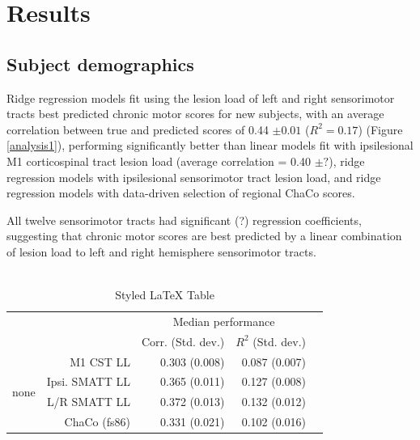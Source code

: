 \documentclass[10pt]{article}
\begin{document}
\section{Results}
\subsection*{Subject demographics}



Ridge regression models fit using the lesion load of left and right sensorimotor tracts best predicted chronic motor scores for new subjects, with an average correlation between true and predicted scores of 0.44 $\pm 0.01$ ($R^2 = 0.17$) (Figure \ref{analysis1}), performing significantly better than linear models fit with ipsilesional M1 corticospinal tract lesion load (average correlation = 0.40 $\pm ?$), ridge regression models with ipsilesional sensorimotor tract lesion load, and ridge regression models with data-driven selection of regional ChaCo scores.

All twelve sensorimotor tracts had significant (?) regression coefficients, suggesting that chronic motor scores are best predicted by a linear combination of lesion load to left and right hemisphere sensorimotor tracts. 
\\
\\
\begin{table}[h]
\centering
\caption{Styled LaTeX Table}
\label{table:5}
\begin{tabular}{rrrrr}
\toprule
 &  & \multicolumn{2}{c}{Median performance} \\
 &  & Corr. (Std. dev.) & $R^2$ (Std. dev.) \\
\midrule
\multirow[t]{4}{*}{none} & M1 CST LL & 0.303 (0.008) & 0.087 (0.007) \\
 & Ipsi. SMATT LL & 0.365 (0.011) & 0.127 (0.008) \\
 & L/R SMATT LL & 0.372 (0.013) & 0.132 (0.012) \\
 & ChaCo (fs86) & 0.331 (0.021) & 0.102 (0.016) \\
\bottomrule
\end{tabular}
\end{table}
\end{document}

